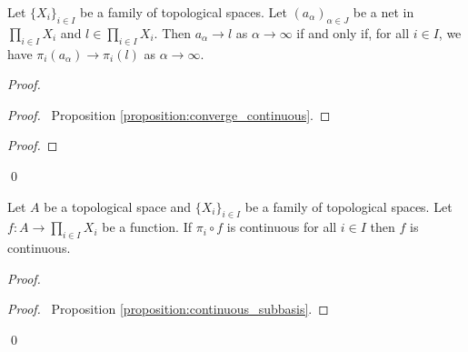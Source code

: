 \begin{proposition}
    \label{proposition:converge_product}
    Let $\{ X_i \}_{i \in I}$ be a family of topological spaces. Let $(a_\alpha)_{\alpha \in J}$ be a net in $\prod_{i \in I} X_i$ and $l \in \prod_{i \in I} X_i$.
    Then $a_\alpha \rightarrow l$ as $\alpha \rightarrow \infty$ if and only if, for all $i \in I$, we have $\pi_i(a_\alpha) \rightarrow \pi_i(l)$ as $\alpha \rightarrow \infty$.
\end{proposition}

\begin{proof}
    \pf
    \begin{proof}
        \pf\ Proposition \ref{proposition:converge_continuous}. %
    \end{proof}
    \begin{proof}
    \end{proof}
    \qed
\end{proof}

\begin{theorem}
    \label{theorem:product_continuous}
        Let $A$ be a topological space and $\{ X_i \}_{i \in I}$ be a family of topological spaces. Let $f : A \rightarrow \prod_{i \in I} X_i$ be a function.
        If $\pi_i \circ f$ is continuous for all $i \in I$ then $f$ is continuous.
\end{theorem}

\begin{proof}
    \pf
    \qedstep
    \begin{proof}
        \pf\ Proposition \ref{proposition:continuous_subbasis}.
    \end{proof}
    \qed
\end{proof}

